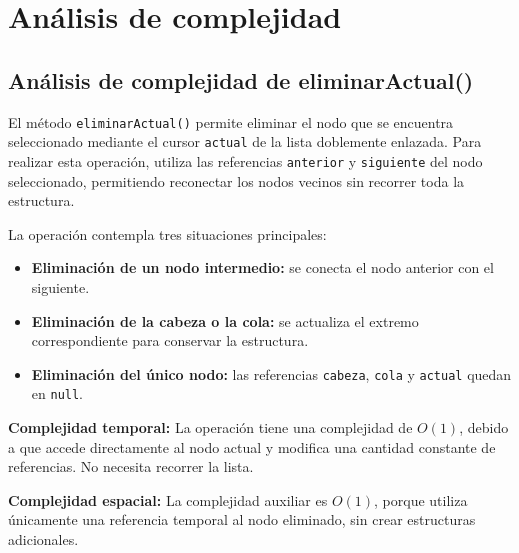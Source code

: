 \documentclass[11pt]{article}
\begin{document}
\section{Análisis de complejidad}




\subsection{Análisis de complejidad de eliminarActual()}

El método \texttt{eliminarActual()} permite eliminar el nodo que se
encuentra seleccionado mediante el cursor \texttt{actual} de la lista
doblemente enlazada. Para realizar esta operación, utiliza las
referencias \texttt{anterior} y \texttt{siguiente} del nodo seleccionado,
permitiendo reconectar los nodos vecinos sin recorrer toda la estructura.

La operación contempla tres situaciones principales:

\begin{itemize}[leftmargin=*]
    \item \textbf{Eliminación de un nodo intermedio:} se conecta el nodo
    anterior con el siguiente.

    \item \textbf{Eliminación de la cabeza o la cola:} se actualiza el
    extremo correspondiente para conservar la estructura.

    \item \textbf{Eliminación del único nodo:} las referencias
    \texttt{cabeza}, \texttt{cola} y \texttt{actual} quedan en
    \texttt{null}.
\end{itemize}

\textbf{Complejidad temporal:} La operación tiene una complejidad
de $O(1)$, debido a que accede directamente al nodo actual y modifica
una cantidad constante de referencias. No necesita recorrer la lista.

\textbf{Complejidad espacial:} La complejidad auxiliar es $O(1)$,
porque utiliza únicamente una referencia temporal al nodo eliminado,
sin crear estructuras adicionales.
\end{document}
